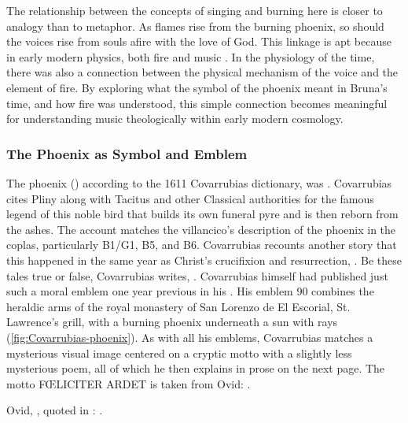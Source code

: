 The relationship between the concepts of singing and burning here is closer to analogy than to metaphor.
As flames rise from the burning phoenix, so should the voices rise from souls afire with the love of God.
This linkage is apt because in early modern physics, both fire and music .
In the physiology of the time, there was also a connection between the physical mechanism of the voice and the element of fire.
By exploring what the symbol of the phoenix meant in Bruna's time, and how fire was understood, this simple connection becomes meaningful for understanding music theologically within early modern cosmology.

\subsubsection{The Phoenix as Symbol and Emblem}

The phoenix () according to the 1611 Covarrubias dictionary, was .%
    \Autocite[400, ]{Covarrubias:Tesoro}
Covarrubias cites Pliny along with Tacitus and other Classical authorities for the famous legend of this noble bird that builds its own funeral pyre and is then reborn from the ashes.
The account matches the villancico's description of the phoenix in the coplas, particularly B1/G1, B5, and B6.
Covarrubias recounts another story that this happened in the same year as Christ's crucifixion and resurrection, .
Be these tales true or false, Covarrubias writes, .%
    \Autocite[400]{Covarrubias:Tesoro}
Covarrubias himself had published just such a moral emblem one year previous in his .
His emblem 90 combines the heraldic arms of the royal monastery of San Lorenzo de El Escorial, St. Lawrence's grill, with a burning phoenix underneath a sun with rays (\cref{fig:Covarrubias-phoenix}).
    \Autocite[f.~290, r--v]{Covarrubias:Emblemas}
As with all his emblems, Covarrubias matches a mysterious visual image centered on a cryptic motto with a slightly less mysterious poem, all of which he then explains in prose on the next page.
The motto FŒLICITER ARDET is taken from Ovid: .%
\begin{footnote}
    Ovid, , quoted in \autocite[290v]{Covarrubias:Emblemas}: 
    .
\end{footnote}

